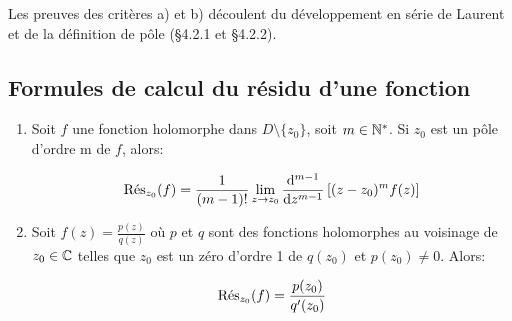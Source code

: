 \begin{remark}
    Les preuves des critères a) et b) découlent du développement en série de Laurent et de la définition de pôle (§4.2.1 et §4.2.2).
\end{remark}

\subsection{Formules de calcul du résidu d'une fonction}

\begin{method}\hfill
    
    \begin{enumerate}[label=\alph*)]
    \item 
    Soit $f$ une fonction holomorphe dans $D\setminus \{ z_0 \}$, soit $m \in \N^\ast$.
    Si $z_0$ est un pôle d'ordre m de $f$, alors:
    
    \[ \Res_{z_0}(f) = \frac{1}{(m - 1)!} \lim\limits_{z \rightarrow z_0} \frac{\dd^{m-1}}{\dz^{m - 1}} \left[ (z - z_0)^m f(z) \right] \]
    
    \item 
    Soit $f(z) = \frac{p(z)}{q(z)}$ où $p$ et $q$ sont des fonctions holomorphes au voisinage de $z_0 \in \Cx$ telles que $z_0$ est un zéro d'ordre 1 de $q(z_0)$ et $p(z_0) \neq 0$.
    Alors:
    
    \[ \Res_{z_0}(f) = \frac{p(z_0)}{q'(z_0)} \]
    \end{enumerate}
\end{method}

